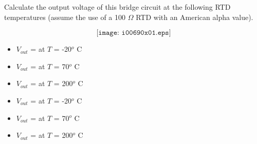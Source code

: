 

Calculate the output voltage of this bridge circuit at the following RTD temperatures (assume the use of a 100 $\Omega$ RTD with an American alpha value).

$$\texttt{[image: i00690x01.eps]}$$

\begin{itemize}
\item{} $V_{out}$ = \underbar{\hskip 50pt} at $T$ = -20$^{o}$ C
\vskip 5pt
\item{} $V_{out}$ = \underbar{\hskip 50pt} at $T$ = 70$^{o}$ C
\vskip 5pt
\item{} $V_{out}$ = \underbar{\hskip 50pt} at $T$ = 200$^{o}$ C
\end{itemize}







\begin{itemize}
\item{} $V_{out}$ =  at $T$ = -20$^{o}$ C
\vskip 5pt
\item{} $V_{out}$ =  at $T$ = 70$^{o}$ C
\vskip 5pt
\item{} $V_{out}$ =  at $T$ = 200$^{o}$ C
\end{itemize}












